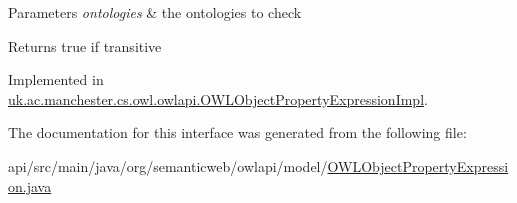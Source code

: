 \begin{DoxyParams}{Parameters}
{\em ontologies} & the ontologies to check \\
\hline
\end{DoxyParams}
\begin{DoxyReturn}{Returns}
true if transitive 
\end{DoxyReturn}


Implemented in \hyperlink{classuk_1_1ac_1_1manchester_1_1cs_1_1owl_1_1owlapi_1_1_o_w_l_object_property_expression_impl_a7e68980990a8f17631a037905a247b15}{uk.\-ac.\-manchester.\-cs.\-owl.\-owlapi.\-O\-W\-L\-Object\-Property\-Expression\-Impl}.



The documentation for this interface was generated from the following file\-:\begin{DoxyCompactItemize}
\item 
api/src/main/java/org/semanticweb/owlapi/model/\hyperlink{_o_w_l_object_property_expression_8java}{O\-W\-L\-Object\-Property\-Expression.\-java}\end{DoxyCompactItemize}
